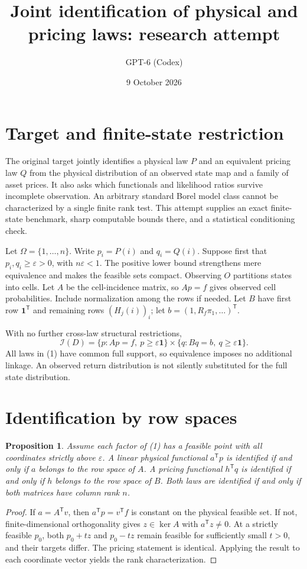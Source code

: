 \documentclass[11pt]{article}
\title{Joint identification of physical and pricing laws: research attempt}
\author{GPT-6 (Codex)}
\date{9 October 2026}
\newtheorem{proposition}{Proposition}
\begin{document}
\maketitle

\section*{Target and finite-state restriction}
The original target jointly identifies a physical law $P$ and an equivalent pricing law $Q$ from the physical distribution of an observed state map and a family of asset prices. It also asks which functionals and likelihood ratios survive incomplete observation. An arbitrary standard Borel model class cannot be characterized by a single finite rank test. This attempt supplies an exact finite-state benchmark, sharp computable bounds there, and a statistical conditioning check.

Let $\Omega=\{1,\ldots,n\}$. Write $p_i=P(i)$ and $q_i=Q(i)$. Suppose first that $p_i,q_i\geq\varepsilon>0$, with $n\varepsilon<1$. The positive lower bound strengthens mere equivalence and makes the feasible sets compact. Observing $O$ partitions states into cells. Let $A$ be the cell-incidence matrix, so $Ap=f$ gives observed cell probabilities. Include normalization among the rows if needed. Let $B$ have first row $\mathbf1^{\mathsf T}$ and remaining rows $(H_j(i))_i$; let $b=(1,R_f\pi_1,\ldots)^{\mathsf T}$.

With no further cross-law structural restrictions,
\[
 \mathcal I(D)=\{p:Ap=f,\ p\geq\varepsilon\mathbf1\}
 \times\{q:Bq=b,\ q\geq\varepsilon\mathbf1\}. \tag{1}
\]
All laws in (1) have common full support, so equivalence imposes no additional linkage. An observed return distribution is not silently substituted for the full state distribution.

\section*{Identification by row spaces}
\begin{proposition}
Assume each factor of (1) has a feasible point with all coordinates strictly above $\varepsilon$. A linear physical functional $a^{\mathsf T}p$ is identified if and only if $a$ belongs to the row space of $A$. A pricing functional $h^{\mathsf T}q$ is identified if and only if $h$ belongs to the row space of $B$. Both laws are identified if and only if both matrices have column rank $n$.
\end{proposition}
\begin{proof}
If $a=A^{\mathsf T}v$, then $a^{\mathsf T}p=v^{\mathsf T}f$ is constant on the physical feasible set. If not, finite-dimensional orthogonality gives $z\in\ker A$ with $a^{\mathsf T}z\ne0$. At a strictly feasible $p_0$, both $p_0+tz$ and $p_0-tz$ remain feasible for sufficiently small $t>0$, and their targets differ. The pricing statement is identical. Applying the result to each coordinate vector yields the rank characterization.
\end{proof}
\end{document}
